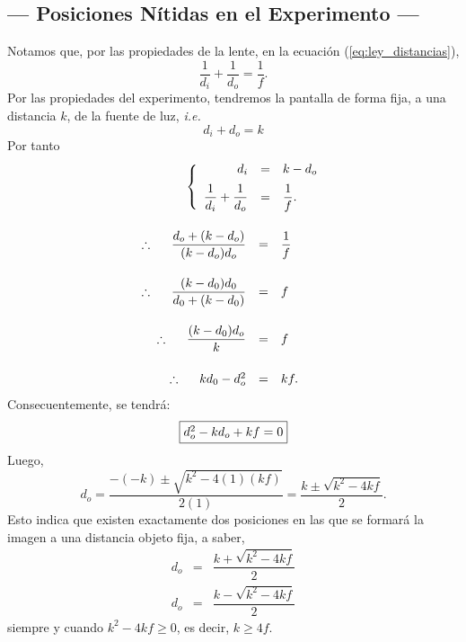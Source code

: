 \documentclass[10pt,a4paper]{article}
\begin{document}
	\subsection{--- Posiciones Nítidas en el Experimento ---} %
	\label{sub:cuentitas}
	Notamos que, por las propiedades de la lente, en la ecuación (\ref{eq:ley_distancias}),
	\[
		\dfrac{1}{d_i} + \dfrac{1}{d_o} = \dfrac{1}{f}.
	\]
	Por las propiedades del experimento, tendremos la pantalla de forma fija, a una distancia \(k\), de la fuente de luz, \textit{i.e.}
	\begin{equation}
		d_i+d_o = k
		\label{eq:fija}
	\end{equation}
	Por tanto
	\[
		\begin{array}{rcl}
			&&\hspace{-2.65cm} \left\{ \begin{array}{rcl}
				d_i & = & k-d_o \\[2mm]
			\dfrac{1}{d_i} + \dfrac{1}{d_o} &= &  \dfrac{1}{f}.
		\end{array}\right. \\[1cm]
			\therefore \hspace{5mm} \dfrac{d_o+(k-d_o)}{(k-d_o) d_o} & = & \dfrac{1}{f} \\[7mm]
			\therefore \hspace{5mm} \dfrac{(k-d_0) d_0}{d_0+(k-d_0)} & = & f \\[7mm]
			\therefore \hspace{5mm} \dfrac{(k-d_0) d_o}{k} & = & f \\[7mm]
			\therefore \hspace{5mm} kd_0-d_o^2 & = & kf.
		\end{array}
	\]
	Consecuentemente, se tendrá:
	\[
		\fbox{\(d_o^2-kd_o+kf =0\)}
	\]
	Luego,
	\[
		d_o = \dfrac{-(-k) \pm \sqrt{k^2-4(1)(kf)}}{2(1)} = \dfrac{k \pm \sqrt{k^2-4kf}}{2}.
	\]
	Esto indica que existen exactamente dos posiciones en las que se formará la imagen a una distancia objeto fija, a saber,
	\[
		\begin{array}{rcl}
			d_o & = & \dfrac{k + \sqrt{k^2-4kf}}{2} \\[7mm]
			d_o & = & \dfrac{k - \sqrt{k^2-4kf}}{2}
		\end{array}
	\]
	siempre y cuando \(k^2-4kf \geqslant 0\), es decir, \(k \geqslant 4f\).

\end{document}
